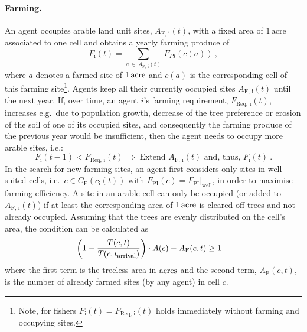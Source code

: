 \paragraph{Farming.}
An agent occupies arable land unit sites, $A_\text{F, i}(t)$, with a fixed area of $1\, \text{acre}$ associated to one cell and obtains a yearly farming produce of
\begin{equation}\label{AProd}
F_\text{i}(t) = \sum_{a \, \in \, A_\text{F, i}(t)} \, F_{PI}(c(a))\ ,
\end{equation}
where $a$ denotes a farmed site of $1\, {\rm acre}$ and $c(a)$ is the corresponding cell of this farming site\footnote{Note, for fishers $F_\text{i}(t) = F_\text{Req, i}(t)$ holds immediately without farming and occupying sites.}.
Agents keep all their currently occupied sites $A_\text{F, i}(t)$ until the next year. %
If, over time, an agent $i$'s farming requirement, $F_\text{Req, i}(t)$, increases e.g.\ due to population growth, decrease of the tree preference or erosion of the soil of one of its occupied sites, and consequently the farming produce of the previous year would be insufficient, then the agent needs to occupy more arable sites, i.e.: 
\begin{equation}
F_\text{i}(t-1) < F_\text{Req, i}(t) \ \Rightarrow \ \text{Extend } A_\text{F, i}(t) \text{ and, thus, } F_\text{i}(t) \ .
\end{equation}
In the search for new farming sites, an agent first considers only sites in well-suited cells, i.e.\ $c \in C_\text{F}(c_\text{i}(t))$ with $F_\text{PI}(c)=F_\text{PI}|_\text{well}$, in order to maximise farming efficiency.
A site in an arable cell can only be occupied (or added to $A_\text{F, i}(t)$) if at least the corresponding area of $1\, {\rm acre}$ is cleared off trees and not already occupied. 
Assuming that the trees are evenly distributed on the cell's area, the condition can be calculated as 
\begin{eqnarray}
\left( 1 - \frac{T(c,t)}{T(c,t_{\rm arrival})} \right) \cdot A(c) - A_\text{F}(c, t) & \geq   1
\label{eq:BurningCond}
\end{eqnarray}
where the first term is the treeless area in ${\rm acres}$ and the second term, $A_\text{F}(c, t)$, is the number of already farmed sites (by any agent) in cell $c$.%

